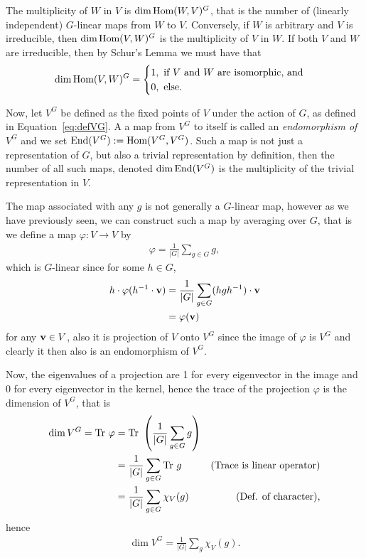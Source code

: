 \begin{proposition}
	The multiplicity of $W$ in $V$ is $\dim \text{Hom}(W,V)^G$, that is the number of (linearly independent) $G$-linear maps from $W$ to $V$. Conversely, if $W$ is arbitrary and $V$ is irreducible, then $\dim \text{Hom} (V,W)^G$ is the multiplicity of $V$ in $W$. If both $V$ and $W$ are irreducible, then by Schur's Lemma we must have that
	\begin{align}\label{eq:dimhomVWG}
		\dim \text{Hom} (V,W)^G = \begin{cases}
			1, \text{ if $V$ and $W$ are isomorphic, and} \\
			0, \text{ else.}
		\end{cases}
	\end{align}
\end{proposition}

Now, let $V^G$ be defined as the fixed points of $V$ under the action of $G$, as defined in Equation~\ref{eq:defVG}. A a map from $V^G$ to itself is called an \textit{endomorphism of $V^G$} and we set $\text{End}(V^G) := \text{Hom}(V^G, V^G)$. Such a map is not just a representation of $G$, but also a trivial representation by definition, then the number of all such maps, denoted $\dim \text{End}(V^G)$ is the multiplicity of the trivial representation in $V$. 

The map associated with any $g$ is not generally a $G$-linear map, however as we have previously seen, we can construct such a map by averaging over $G$, that is we define a map $\varphi: V \rightarrow V$ by
\begin{align*}
	\varphi = \frac{1}{|G|} \sum_{g \in G} g,
\end{align*}
which is $G$-linear since for some $h \in G$, \begin{align*}
	h \cdot \varphi(h^{-1} \cdot \mathbf{v}) &= \frac{1}{|G|} \sum_{g \in G} (hgh^{-1}) \cdot \mathbf{v} \\
	&= \varphi(\mathbf{v})
\end{align*} for any $\mathbf{v} \in V$, also it is projection of $V$ onto $V^G$ since the image of $\varphi$ is $V^G$ and clearly it then also is an endomorphism of $V^G$. 

Now, the eigenvalues of a projection are 1 for every eigenvector in the image and 0 for every eigenvector in the kernel, hence the trace of the projection $\varphi$ is the dimension of $V^G$, that is
\begin{align*}
	\dim V^G = \text{Tr } \varphi &= \text{Tr } \left( \frac{1}{|G|} \sum_{g \in G} g \right) \\
	&= \frac{1}{|G|} \sum_{g \in G} \text{Tr } g & \text{(Trace is linear operator)} \\
	&= \frac{1}{|G|} \sum_{g \in G} \chi_{V}(g) & \text{(Def. of character)},
\end{align*}
hence \begin{align}\label{eq:multVG}
	\dim V^G = \frac{1}{|G|} \sum_g \chi_V(g).
\end{align}

